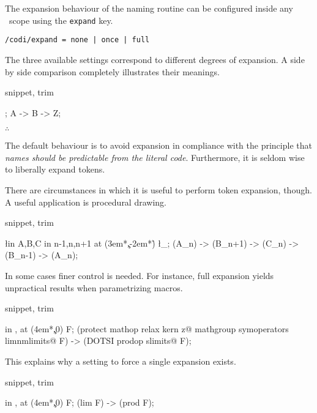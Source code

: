 The expansion behaviour of the naming routine can be configured
inside any \CoDi\ scope using the \lstinline!expand! key.

\begin{lstlisting}
/codi/expand = none | once | full
\end{lstlisting}

The three available settings correspond to different degrees of expansion.
A side by side comparison completely illustrates their meanings.

\begin{tcblisting}{snippet, trim}
\begin{codi}
\def\B{Z}
\def\A{\B}
\obj{ |[expand=none]| \A &     %
      |[expand=once]| \A &     %
      |[expand=full]| \A \\ }; %
\mor A -> B -> Z;
\end{codi}
\end{tcblisting}

\hfill$\therefore$\hfill\null

The default behaviour is to avoid expansion in compliance with the principle
that \emph{names should be predictable from the \emph{literal} code}.
Furthermore, it is seldom wise to liberally expand tokens.

There are circumstances in which it is useful to perform token expansion,
though. A useful application is procedural drawing.

\begin{tcblisting}{snippet, trim}
\begin{codi}
\foreach [count=\r] \l in {A,B,C}
  \foreach [count=\c] \n in {n-1,n,n+1}
    \obj [expand=full] at (3em*\c,-2em*\r) {\l_{\n}};
\mor (A_{n}) -> (B_{n+1}) -> (C_{n}) -> (B_{n-1}) -> (A_{n});
\end{codi}
\end{tcblisting}

In some cases finer control is needed. For instance, full expansion
yields unpractical results when parametrizing macros.

\begin{tcblisting}{snippet, trim}
\begin{codi}
\foreach [count=\c] \m in {\lim,\prod}
  \obj [expand=full] at (4em*\c,0) {\m F};
\mor (protect mathop {relax kern z@ mathgroup
                        symoperators lim}nmlimits@ F)
  -> (DOTSI prodop slimits@ F);
\end{codi}
\end{tcblisting}

This explains why a setting to force a single expansion exists.

\begin{tcblisting}{snippet, trim}
\begin{codi}
\foreach [count=\c] \m in {\lim,\prod}
  \obj [expand=once] at (4em*\c,0) {\m F};
\mor (lim F) -> (prod F);
\end{codi}
\end{tcblisting}

